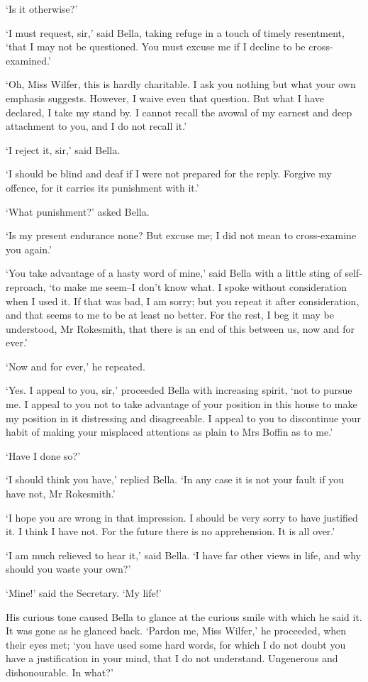 ‘Is it otherwise?’

‘I must request, sir,’ said Bella, taking refuge in a touch of timely
resentment, ‘that I may not be questioned. You must excuse me if I
decline to be cross-examined.’

‘Oh, Miss Wilfer, this is hardly charitable. I ask you nothing but what
your own emphasis suggests. However, I waive even that question. But
what I have declared, I take my stand by. I cannot recall the avowal of
my earnest and deep attachment to you, and I do not recall it.’

‘I reject it, sir,’ said Bella.

‘I should be blind and deaf if I were not prepared for the reply.
Forgive my offence, for it carries its punishment with it.’

‘What punishment?’ asked Bella.

‘Is my present endurance none? But excuse me; I did not mean to
cross-examine you again.’

‘You take advantage of a hasty word of mine,’ said Bella with a little
sting of self-reproach, ‘to make me seem--I don’t know what. I spoke
without consideration when I used it. If that was bad, I am sorry; but
you repeat it after consideration, and that seems to me to be at least
no better. For the rest, I beg it may be understood, Mr Rokesmith, that
there is an end of this between us, now and for ever.’

‘Now and for ever,’ he repeated.

‘Yes. I appeal to you, sir,’ proceeded Bella with increasing spirit,
‘not to pursue me. I appeal to you not to take advantage of your
position in this house to make my position in it distressing and
disagreeable. I appeal to you to discontinue your habit of making your
misplaced attentions as plain to Mrs Boffin as to me.’

‘Have I done so?’

‘I should think you have,’ replied Bella. ‘In any case it is not your
fault if you have not, Mr Rokesmith.’

‘I hope you are wrong in that impression. I should be very sorry to
have justified it. I think I have not. For the future there is no
apprehension. It is all over.’

‘I am much relieved to hear it,’ said Bella. ‘I have far other views in
life, and why should you waste your own?’

‘Mine!’ said the Secretary. ‘My life!’

His curious tone caused Bella to glance at the curious smile with which
he said it. It was gone as he glanced back. ‘Pardon me, Miss Wilfer,’
he proceeded, when their eyes met; ‘you have used some hard words, for
which I do not doubt you have a justification in your mind, that I do
not understand. Ungenerous and dishonourable. In what?’


